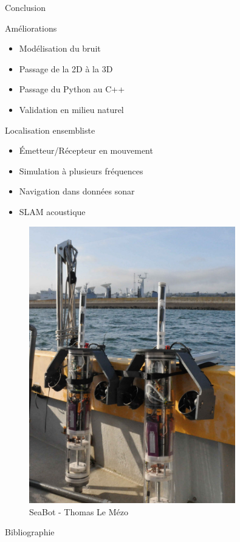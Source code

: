 \documentclass[9pt, xcolor={usenames, dvipsnames}]{beamer}
\begin{document}
			\begin{frame}{Conclusion}
				\centering
				\begin{minipage}{0.55\textwidth}
					\begin{block}{Améliorations}
						\begin{itemize}
							\item Modélisation du bruit 
							\item Passage de la 2D à la 3D
							\item Passage du Python au C++
							\item Validation en milieu naturel
						\end{itemize}
					\end{block}

					\begin{block}{Localisation ensembliste}
						\begin{itemize}
							\item Émetteur/Récepteur en mouvement
							\item Simulation à plusieurs fréquences
							\item Navigation dans données sonar
							\item SLAM acoustique
						\end{itemize}
					\end{block}
				\end{minipage}
				\hfill
				\begin{minipage}{0.4\textwidth}
					\centering
					\begin{figure}
						\includegraphics[width=0.8\textwidth]{images/seabot.png}
						\caption{SeaBot - Thomas Le Mézo}
					\end{figure}
				\end{minipage}
			\end{frame}
	
		\begin{frame}{Bibliographie}
			\printbibliography
		\end{frame}
\end{document}
